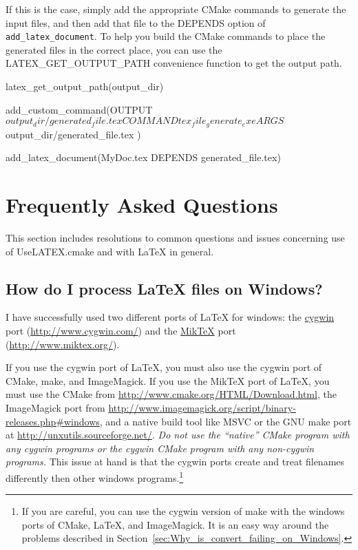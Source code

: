 \documentclass{article}
\newcommand*{\textfile}[1]{\textsf{#1}}
\newcommand*{\textcmake}[1]{\texttt{#1}}
\newcommand*{\UseLATEX}{\textfile{UseLATEX.cmake}\xspace}
\newcommand*{\latex}{\LaTeX\xspace}
\newcommand*{\miktex}{Mik\TeX\xspace}
\newcommand*{\ald}{\textcmake{add\_latex\_document}\xspace}
\begin{document}
  If this is the case, simply add the appropriate CMake commands to
  generate the input files, and then add that file to the DEPENDS option of
  \ald.  To help you build the CMake commands to place the generated files
  in the correct place, you can use the LATEX\_GET\_OUTPUT\_PATH convenience
  function to get the output path.

  \begin{CodeListing}
latex_get_output_path(output_dir)

add_custom_command(OUTPUT ${output_dir}/generated_file.tex
  COMMAND tex_file_generate_exe
  ARGS ${output_dir}/generated_file.tex
  )

add_latex_document(MyDoc.tex DEPENDS generated_file.tex)
  \end{CodeListing}


  \section{Frequently Asked Questions}
  \label{sec:FrequentlyAskedQuestions}

  This section includes resolutions to common questions and issues
  concerning use of \UseLATEX and with \latex in general.

  \subsection{How do I process \latex files on Windows?}
  \label{sec:How_do_I_process_latex_files_on_Windows}

  I have successfully used two different ports of LaTeX for windows: the
  \href{http://www.cygwin.com/}{cygwin} port
  (\href{http://www.cygwin.com/}{http://www.cygwin.com/}) and the
  \href{http://www.miktex.org/}{\miktex} port
  (\href{http://www.miktex.org/}{http://www.miktex.org/}).

  If you use the cygwin port of \latex, you must also use the cygwin port
  of CMake, make, and ImageMagick. If you use the \miktex port of \latex,
  you must use the CMake from
  \href{http://www.cmake.org/HTML/Download.html}{http://www.cmake.org/HTML/Download.html},
  the ImageMagick port from
  \href{http://www.imagemagick.org/script/binary-releases.php#windows}{http://www.imagemagick.org/script/binary-releases.php\#windows},
  and a native build tool like MSVC or the GNU make port at
  \href{http://unxutils.sourceforge.net/}{http://unxutils.sourceforge.net/}.
  \emph{Do not use the ``native'' CMake program with any cygwin programs or
  the cygwin CMake program with any non-cygwin programs.} This issue at
  hand is that the cygwin ports create and treat filenames differently then
  other windows programs.\footnote{If you are careful, you can use the
  cygwin version of make with the windows ports of CMake, \latex, and
  ImageMagick.  It is an easy way around the problems described in
  Section~\ref{sec:Why_is_convert_failing_on_Windows}.}
\end{document}
